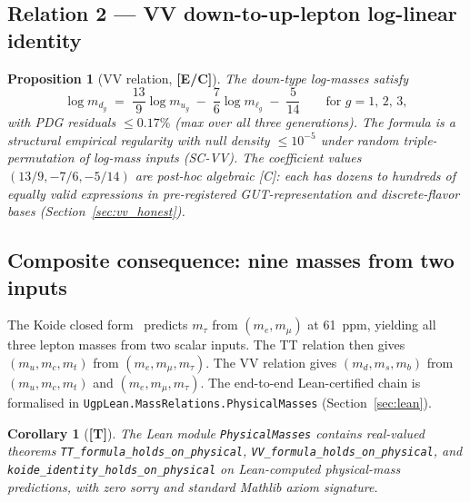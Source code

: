 \documentclass[11pt]{article}
\newtheorem{proposition}[theorem]{Proposition}
\newtheorem{corollary}[theorem]{Corollary}
\theoremstyle{remark}
\newcommand{\lean}[1]{\texttt{\small#1}}
\begin{document}
\subsection{Relation 2 --- VV down-to-up-lepton log-linear identity}
\label{sec:vv}

\begin{tcolorbox}[claimA]
\begin{proposition}[VV relation, \textbf{[E/C]}]
\label{prop:VV}
The down-type log-masses satisfy
\begin{equation}
  \log m_{d_g} \;=\; \frac{13}{9}\log m_{u_g}
                    \;-\; \frac{7}{6}\log m_{\ell_g}
                    \;-\; \frac{5}{14}
  \qquad \text{for } g = 1,\, 2,\, 3,
  \label{eq:VV}
\end{equation}
with PDG residuals $\leq 0.17\%$ (max over all three generations).
The \emph{formula} is a structural empirical regularity with null density
$\leq 10^{-5}$ under random triple-permutation of log-mass inputs (SC-VV).
The \emph{coefficient values} $(13/9,-7/6,-5/14)$ are post-hoc algebraic
[C]: each has dozens to hundreds of equally valid expressions in
pre-registered GUT-representation and discrete-flavor bases
(Section~\ref{sec:vv_honest}).
\end{proposition}
\end{tcolorbox}

\subsection{Composite consequence: nine masses from two inputs}
\label{sec:composite}

The Koide closed form~\cite{Spivack2026_Koide} predicts $m_\tau$ from $(m_e,m_\mu)$
at 61~ppm, yielding all three lepton masses from two scalar inputs.
The TT relation then gives $(m_u,m_c,m_t)$ from $(m_e,m_\mu,m_\tau)$.
The VV relation gives $(m_d,m_s,m_b)$ from $(m_u,m_c,m_t)$ and
$(m_e,m_\mu,m_\tau)$.
The end-to-end Lean-certified chain is formalised in
\lean{UgpLean.MassRelations.PhysicalMasses} (Section~\ref{sec:lean}).

\begin{tcolorbox}[claimA]
\begin{corollary}[\textbf{[T]}]
The Lean module \lean{PhysicalMasses} contains real-valued theorems
\lean{TT\_formula\_holds\_on\_physical},
\lean{VV\_formula\_holds\_on\_physical}, and
\lean{koide\_identity\_holds\_on\_physical} on Lean-computed physical-mass
predictions, with zero sorry and standard Mathlib axiom signature.
\end{corollary}
\end{tcolorbox}
\end{document}
